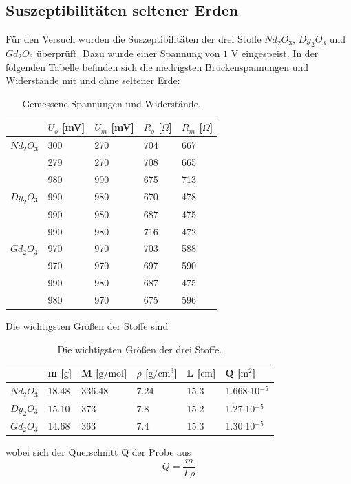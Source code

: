 \documentclass[a4paper]{scrartcl}
\begin{document}
\subsection{Suszeptibilitäten seltener Erden}
Für den Versuch wurden die Suszeptibilitäten der drei Stoffe $Nd_2 O_3$, $Dy_2 O_3$ und $Gd_2 O_3$ überprüft. Dazu wurde einer Spannung von $1$ V eingespeist. In der folgenden Tabelle befinden sich die niedrigsten Brückenspannungen und Widerstände mit und ohne seltener Erde:
\begin{table}[H]
  \centering
  \caption{Gemessene Spannungen und Widerstände.}
  \begin{tabular}{l|l|l|l|l}
  & $U_{o}$ [mV] & $U_{m}$ [mV] & $R_{o}$ [$\Omega$] & $R_{m}$ [$\Omega$]\\ \hline
  $Nd_2 O_3$ & 300 & 270 & 704 & 667\\
  & 279 & 270 & 708 & 665\\
  & 980 & 990 & 675 & 713\\ \hline
  $Dy_2 O_3$ & 990 & 980 & 670 & 478\\
  & 990 & 980 & 687 & 475\\
  & 990 & 980 & 716 & 472\\ \hline
  $Gd_2 O_3$ & 970 & 970 & 703 & 588\\
  & 970 & 970 & 697 & 590\\
  & 990 & 980 & 687 & 475\\
  & 980 & 970 & 675 & 596\\ \hline
  \end{tabular}
\end{table}
Die wichtigsten Größen der Stoffe sind
\begin{table}[H]
  \centering
  \caption{Die wichtigsten Größen der drei Stoffe.}
  \begin{tabular}{l|l|l|l|l|l}
  & m [$\mathrm{g}$] & M [$\mathrm{g/mol}$] & $\rho$ [$\mathrm{g/cm^3}$] & L [$\mathrm{cm}$] & Q [$\mathrm{m^2}$]\\ \hline
  $Nd_2 O_3$ & 18.48 & 336.48 & 7.24 & 15.3 & 1.668$\cdot$10$^{-5}$ \\ \hline
  $Dy_2 O_3$ & 15.10 & 373 & 7.8 & 15.2 & 1.27$\cdot$10$^{-5}$ \\ \hline
  $Gd_2 O_3$ & 14.68 & 363 & 7.4 & 15.3 & 1.30$\cdot$10$^{-5}$ \\ \hline
  \end{tabular}
\end{table}
wobei sich der Querschnitt Q der Probe aus 
\begin{equation*}
  Q=\frac{m}{L\rho}
\end{equation*}
\end{document}
